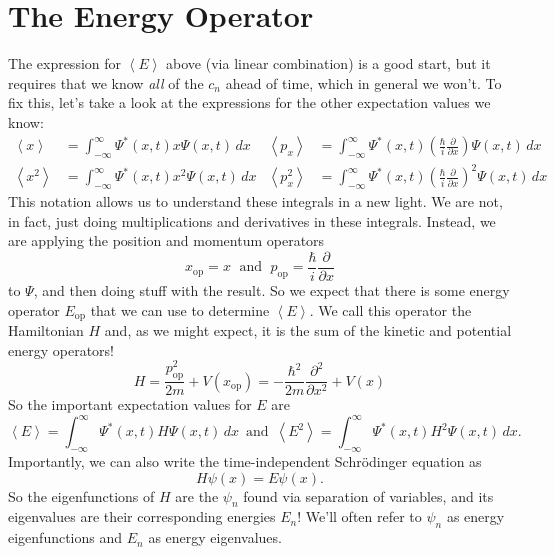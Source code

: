\documentclass[../p052main.tex]{subfiles}
\begin{document}

\section{The Energy Operator}
The expression for $\left< E \right>$ above (via linear combination) is a good start, but it requires that we know \textit{all} of the $c_n$ ahead of time, which in general we won't.
To fix this, let's take a look at the expressions for the other expectation values we know:
\begin{align*}
    \left< x \right> &= \int_{-\infty}^{\infty} \Psi^*(x,t) x \Psi(x,t) \,dx & \left< p_x \right> &= \int_{-\infty}^{\infty} \Psi^*(x,t) \left( \frac{\hbar}{i} \frac{\partial}{\partial x} \right) \Psi(x,t) \,dx \\
    \left< x^2 \right> &= \int_{-\infty}^{\infty} \Psi^*(x,t) x^2 \Psi(x,t) \,dx & \left< p_x^2 \right> &= \int_{-\infty}^{\infty} \Psi^*(x,t) \left( \frac{\hbar}{i} \frac{\partial}{\partial x} \right)^2 \Psi(x,t) \,dx
\end{align*}
This notation allows us to understand these integrals in a new light.
We are not, in fact, just doing multiplications and derivatives in these integrals.
Instead, we are applying the position and momentum operators
\[ x_\textrm{op} = x \;\text{ and }\; p_\textrm{op} = \frac{\hbar}{i} \frac{\partial}{\partial x} \]
to $\Psi$, and then doing stuff with the result.
So we expect that there is some energy operator $E_\textrm{op}$ that we can use to determine $\left< E \right>$.
We call this operator the Hamiltonian $H$ and, as we might expect, it is the sum of the kinetic and potential energy operators!
\[ H = \frac{p_\textrm{op}^2}{2m} + V(x_\textrm{op}) = -\frac{\hbar^2}{2m}\frac{\partial^2}{\partial x^2} + V(x) \]
So the important expectation values for $E$ are
\[ \left< E \right> = \int_{-\infty}^{\infty} \Psi^*(x,t) H \Psi(x,t) \,dx \,\text{ and }\, \left< E^2 \right> = \int_{-\infty}^{\infty} \Psi^*(x,t) H^2 \Psi(x,t) \,dx. \]
Importantly, we can also write the time-independent Schrödinger equation as
\[ H \psi(x) = E \psi(x). \]
So the eigenfunctions of $H$ are the $\psi_n$ found via separation of variables, and its eigenvalues are their corresponding energies $E_n$!
We'll often refer to $\psi_n$ as energy eigenfunctions and $E_n$ as energy eigenvalues.
\end{document}
